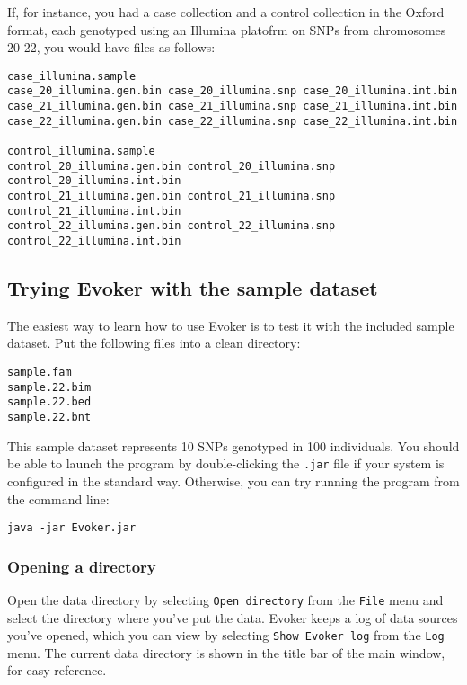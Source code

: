 \documentclass{article}
\begin{document}
If, for instance, you had a case collection and a control collection in the Oxford format, each genotyped using an Illumina platofrm on SNPs from chromosomes 20-22, you would have files as follows:

\begin{verbatim}
case_illumina.sample
case_20_illumina.gen.bin case_20_illumina.snp case_20_illumina.int.bin 
case_21_illumina.gen.bin case_21_illumina.snp case_21_illumina.int.bin 
case_22_illumina.gen.bin case_22_illumina.snp case_22_illumina.int.bin

control_illumina.sample
control_20_illumina.gen.bin control_20_illumina.snp control_20_illumina.int.bin 
control_21_illumina.gen.bin control_21_illumina.snp control_21_illumina.int.bin 
control_22_illumina.gen.bin control_22_illumina.snp control_22_illumina.int.bin
\end{verbatim}

\subsection{Trying Evoker with the sample dataset}

The easiest way to learn how to use Evoker is to test it with the included sample dataset. Put the following files into a clean directory:

\begin{verbatim}
sample.fam
sample.22.bim
sample.22.bed
sample.22.bnt
\end{verbatim}

This sample dataset represents 10 SNPs genotyped in 100 individuals. You should be able to launch the program by double-clicking the \texttt{.jar} file if your system is configured in the standard way. Otherwise, you can try running the program from the command line:

\begin{verbatim}
java -jar Evoker.jar
\end{verbatim}

\subsubsection{Opening a directory}
Open the data directory by selecting \texttt{Open directory} from the \texttt{File} menu and select the directory where you've put the data. Evoker keeps a log of data sources you've opened, which you can view by selecting \texttt{Show Evoker log} from the \texttt{Log} menu. The current data directory is shown in the title bar of the main window, for easy reference.
\end{document}
